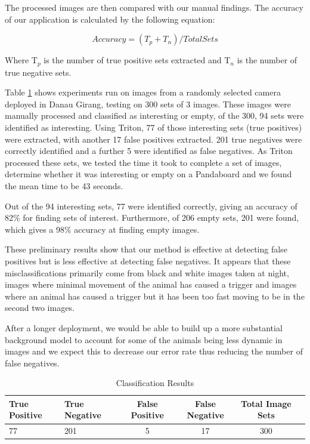 		The processed images are then compared with our manual findings. The accuracy of our application is calculated by the following equation:
		
		\begin{equation}Accuracy = (T_{p} + T_{n})/Total Sets\end{equation}
		
		Where T$_{p}$  is the number of true positive sets extracted and T$_{n}$  is the number of true negative sets.
		
		Table \ref{table:processing} shows experiments run on images from a randomly selected camera deployed in Danau Girang, testing on 300 sets of 3 images. These images were manually processed and classified as interesting or empty, of the 300, 94 sets were identified as interesting. Using Triton, 77 of those interesting sets (true positives) were extracted, with another 17 false positives extracted. 201 true negatives were correctly identified and a further 5 were identified as false negatives. As Triton processed these sets, we tested the time it took to complete a set of images, determine whether it was interesting or empty on a Pandaboard and we found the mean time to be 43 seconds. 
		
		Out of the 94 interesting sets, 77 were identified correctly, giving an accuracy of 82\% for finding sets of interest. Furthermore, of 206 empty sets, 201 were found, which gives a 98\% accuracy at finding empty images.
	
		These preliminary results show that our method is effective at detecting false positives but is less effective at detecting false negatives. It appears that these misclassifications primarily come from black and white images taken at night, images where minimal movement of the animal has caused a trigger and images where an animal has caused a trigger but it has been too fast moving to be in the second two images.
		
		After a longer deployment, we would be able to build up a more substantial background model to account for some of the animals being less dynamic in images and we expect this to decrease our error rate thus reducing the number of false negatives. 
		
		\begin{footnotesize}
		\begin{table}
		\centering
			\hfill{}
			\begin{tabular}{|l|l|c|c|c|c|}
				\hline
					True Positive & True Negative & False Positive  & False Negative & Total Image Sets \\
				\hline
					77 & 201 & 5 & 17 & 300 \\
				\hline
			\end{tabular}
			\hfill{}
			\caption{Classification Results}
			\label{table:processing}
		\end{table}
		\end{footnotesize}
		

